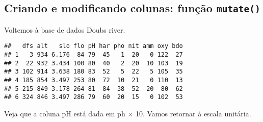 \documentclass[
]{book}
\newenvironment{Shaded}{\begin{snugshade}}{\end{snugshade}}
\newcommand{\DataTypeTok}[1]{\textcolor[rgb]{0.13,0.29,0.53}{#1}}
\newcommand{\DecValTok}[1]{\textcolor[rgb]{0.00,0.00,0.81}{#1}}
\newcommand{\KeywordTok}[1]{\textcolor[rgb]{0.13,0.29,0.53}{\textbf{#1}}}
\newcommand{\NormalTok}[1]{#1}
\newcommand{\OperatorTok}[1]{\textcolor[rgb]{0.81,0.36,0.00}{\textbf{#1}}}
\newcommand{\StringTok}[1]{\textcolor[rgb]{0.31,0.60,0.02}{#1}}
\begin{document}
\begin{Shaded}
\end{Shaded}

\hypertarget{criando-e-modificando-colunas-funuxe7uxe3o-mutate}{%
\subsection{\texorpdfstring{Criando e modificando colunas: função \texttt{mutate()}}{Criando e modificando colunas: função mutate()}}\label{criando-e-modificando-colunas-funuxe7uxe3o-mutate}}

Voltemos à base de dados Doubs river.

\begin{Shaded}
\end{Shaded}

\begin{verbatim}
##   dfs alt   slo flo pH har pho nit amm oxy bdo
## 1   3 934 6.176  84 79  45   1  20   0 122  27
## 2  22 932 3.434 100 80  40   2  20  10 103  19
## 3 102 914 3.638 180 83  52   5  22   5 105  35
## 4 185 854 3.497 253 80  72  10  21   0 110  13
## 5 215 849 3.178 264 81  84  38  52  20  80  62
## 6 324 846 3.497 286 79  60  20  15   0 102  53
\end{verbatim}

Veja que a coluna pH está dada em ph \(\times\) 10. Vamos retornar à escala unitária.

\begin{Shaded}
\end{Shaded}
\end{document}
